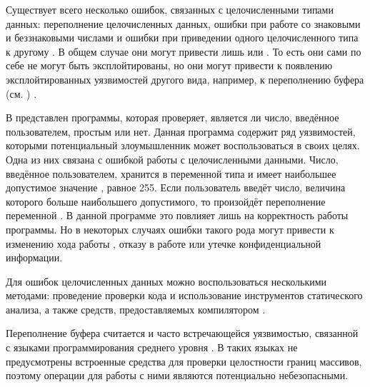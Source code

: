 %
%
Существует всего несколько  ошибок, связанных с целочисленными типами данных: переполнение целочисленных данных, ошибки при работе со знаковыми и беззнаковыми числами и ошибки при приведении одного целочисленного типа к другому     . 
%
В общем случае они могут привести лишь  или . 
%
То есть они сами по себе не могут быть эксплойтированы, но они могут привести к появлению эксплойтированных уязвимостей другого вида, например, к переполнению буфера (см. ) . 

%
В  представлен  программы, которая проверяет, является ли число, введённое пользователем, простым или нет. 
%
Данная программа содержит ряд уязвимостей, которыми потенциальный злоумышленник может воспользоваться в своих целях. 
%
Одна из них связана с ошибкой работы с целочисленными данными.
%
Число, введённое пользователем, хранится в переменной  типа  и имеет наибольшее допустимое значение , равное 255.
%
Если пользователь введёт число, величина которого больше наибольшего допустимого, то произойдёт переполнение переменной . 
%
В данной программе это повлияет лишь на корректность работы программы. 
%
Но в некоторых случаях ошибки такого рода могут привести к изменению хода работы , отказу в работе или утечке конфиденциальной информации.

%
Для  ошибок целочисленных данных можно воспользоваться несколькими методами: проведение проверки кода и использование инструментов статического анализа, а также средств, предоставляемых компилятором  .



%
Переполнение буфера считается  и часто встречающейся уязвимостью, связанной с языками программирования среднего уровня . 
%
В таких языках не предусмотрены встроенные средства для проверки целостности границ массивов, поэтому операции для работы с ними являются потенциально небезопасными. 

